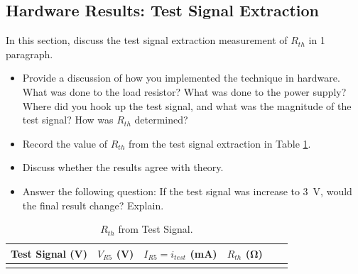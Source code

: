\documentclass[11pt]{article}
\begin{document}
  \subsection{Hardware Results:  Test Signal Extraction}
  In this section, discuss the  test signal extraction measurement of $R_{th}$ in  1 paragraph.
  \begin{itemize}
  	\item Provide a discussion of how you implemented the technique in hardware.  What was done to the load resistor? What was done to the power supply? Where did you hook up the test signal, and what was the magnitude of the test signal? How was $R_{th}$ determined?
  	\item Record the value of $R_{th}$ from the test signal extraction in Table \ref{Table:Lab3ReqTestSignal}.
  	\item Discuss whether the results agree with theory.
  	\item Answer the following question: If the test signal was increase to 3~\si{\volt}, would the final result change? Explain.
  \end{itemize}
  \begin{table}[h!]
  	\centering
  	\caption{$R_{th}$ from Test Signal.}
  	\label{Table:Lab3ReqTestSignal}
  	\begin{tabular}{|c|c|c|c|c|c|}
  		\hline
  		Test Signal  (\si{\volt}) &$V_{R5}$ (\si{\volt}) & $I_{R5}=i_{test}$ (\si{\milli\ampere}) & $R_{th}$ (\si{\ohm})\\
  		\hline
  		& & &  \\	 \hline 
  	\end{tabular}
  \end{table}
  
\end{document}
